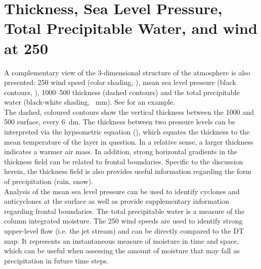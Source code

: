 \section{Thickness, Sea Level Pressure, Total Precipitable Water, and wind at \SI{250}{\hPa}}
\label{sec:Geop}
A complementary view of the 3-dimensional structure of the atmosphere is also presented:  \SI{250}{\hPa} wind speed (color shading, \SI{}{\mPs}), mean sea level pressure (black contours, \SI{}{\hPa}), \num{1000}--\SI{500}{\hPa} thickness (dashed contours) and the total precipitable water (black-white shading, \SI{}{\mm}). See  for an example.
% 
\\
The dashed, coloured contours show the vertical thickness between the \SI{1000}{\hPa} and \SI{500}{\hPa} surface, every \SI{6}{\deca\meter}. The thickness between two pressure levels can be interpreted via the hypsometric equation (), which equates the thickness to the mean temperature of the layer in question. In a relative sense, a larger thickness indicates a warmer air mass. In addition, strong horizontal gradients in the thickness field can be related to frontal boundaries.  Specific to the discussion herein, the thickness field is also provides useful information regarding the form of precipitation (rain, snow).
\\
Analysis of the mean sea level pressure can be used to identify cyclones and anticyclones at the surface as well as provide supplementary information regarding frontal boundaries.
The total precipitable water is a measure of the column integrated moisture.
The \SI{250}{\hPa} wind speeds are used to identify strong upper-level flow (i.e. the jet stream) and can be directly compared to the DT map.
It represents an instantaneous measure of moisture in time and space, which can be useful when assessing the amount of moisture that may fall as precipitation in future time steps.

% 
